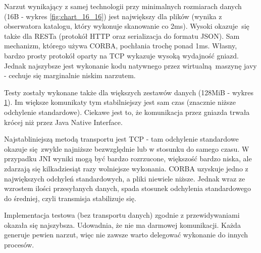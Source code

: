 Narzut wynikający z samej technologii przy minimalnych rozmiarach danych (16B - wykres \ref{fig:chart_16_16}) jest największy dla plików (wynika z obserwatora katalogu, który wykonuje skanowanie co 2ms). Wysoki okazuje się także dla RESTa (protokół HTTP oraz serializacja do formatu JSON). Sam mechanizm, którego używa CORBA, pochłania trochę ponad 1ms. Własny, bardzo prosty protokół oparty na TCP wykazuje wysoką wydajność gniazd. Jednak najszybsze jest wykonanie kodu natywnego przez wirtualną maszynę javy - cechuje się marginalnie niskim narzutem.
 

\begin{figure}[H]
\caption{}
\label{fig:chart_134217728_134217728}
\end{figure}

Testy zostały wykonane także dla większych zestawów danych (128MiB - wykres \ref{fig:chart_134217728_134217728}). Im większe komunikaty tym stabilniejszy jest sam czas (znacznie niższe odchylenie standardowe). Ciekawe jest to, że komunikacja przez gniazda trwała krócej niż przez Java Native Interface.

Najstabliniejszą metodą transportu jest TCP - tam odchylenie standardowe okazuje się zwykle najniższe bezwzględnie lub w stosunku do samego czasu. W przypadku JNI wyniki mogą być bardzo rozrzucone, większość bardzo niska, ale zdarzają się kilkadziesiąt razy wolniejsze wykonania.
CORBA uzyskuje jedno z największych odchyleń standardowych, a pliki niewiele niższe. Jednak wraz ze wzrostem ilości przesyłanych danych, spada stosunek odchylenia standardowego do średniej, czyli transmisja stabilizuje się.

Implementacja testowa (bez transportu danych) zgodnie z przewidywaniami okazała się najszybsza. Udowadnia, że nie ma darmowej komunikacji. Każda generuje pewien narzut, więc nie zawsze warto delegować wykonanie do innych procesów.


